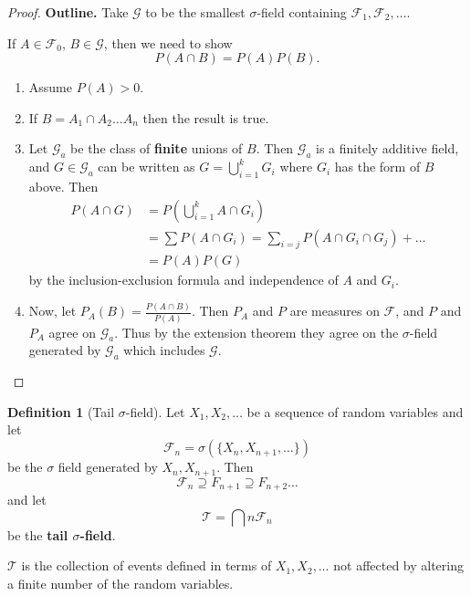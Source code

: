\documentclass[10pt, oneside, reqno]{amsart}
\theoremstyle{plain}%
\theoremstyle{definition}
\newtheorem{defn}[thm]{Definition}
\theoremstyle{remark}
\newcommand{\sigf}{\mathcal{F}}
\begin{document}
\begin{proof}
    \textbf{Outline.} Take $\mathcal{G}$ to be the smallest $\sigma$-field containing $\sigf_1, \sigf_2, \dots$.  
    
    If $A \in \sigf_0$, $B \in \mathcal{G}$, then we need to show \[
        P(A \cap B) = P(A) P(B).
    \]
    \begin{enumerate}[(1)]
        \item Assume $P(A) > 0$. 
        \item If $B = A_1 \cap A_2 \dots A_n$ then the result is true.
        \item Let $\mathcal{G}_a$ be the class of \textbf{finite} unions of $B$.  Then $\mathcal{G}_a$ is a finitely additive field, and $G \in \mathcal{G}_a$ can be written as $G = \bigcup_{i=1}^k G_i$ where $G_i$ has the form of $B$ above.  Then 
        \begin{align*}
            P(A \cap G) &= P( \bigcup_{i=1}^k A \cap G_i) \\
                        &= \sum P(A \cap G_i) = \sum_{i=j} P(A \cap G_i \cap G_j) + \dots \\
                        &= P(A) P(G)
        \end{align*} by the inclusion-exclusion formula and independence of $A$ and $G_i$.  
        \item Now, let $P_A(B) = \frac{P(A\cap B)}{P(A)}$.  Then $P_A$ and $P$ are measures on $\sigf$, and $P$ and $P_A$ agree on $\mathcal{G}_a$.  Thus by the extension theorem they agree on the $\sigma$-field generated by $\mathcal{G}_a$ which includes $\mathcal{G}$.
    \end{enumerate}
\end{proof}

\begin{defn}[Tail $\sigma$-field]
    Let $X_1, X_2, \dots$ be a sequence of random variables and let \[
        \sigf_n = \sigma(\{ X_n , X_{n+1}, \dots \})
    \] be the $\sigma$ field generated by $X_n, X_{n+1}$.  Then \[
        \sigf_n \supseteq F_{n+1} \supseteq F_{n+2} \dots
    \] and let \[
        \mathcal{T} = \bigcap{n} \sigf_n
    \] be the \textbf{tail $\sigma$-field}.
    
    $\mathcal{T}$ is the collection of events defined in terms of $X_1, X_2, \dots$ not affected by altering a finite number of the random variables.  

\end{defn}
\end{document}
